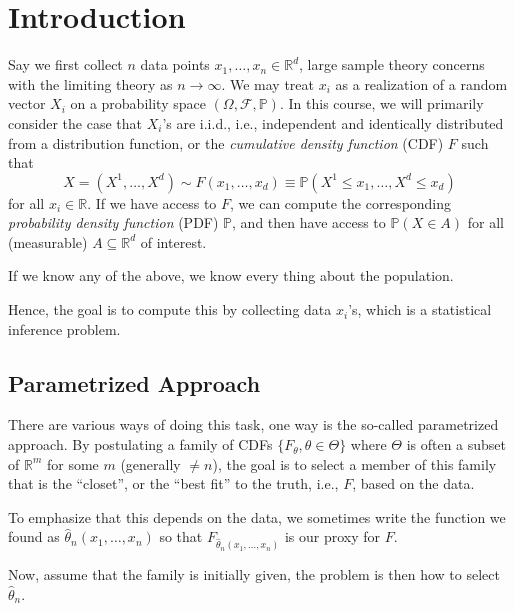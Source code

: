 \chapter{Introduction}
Say we first collect \(n\) data points \(x_1, \dots , x_n \in \mathbb{R} ^d\), large sample theory concerns with the limiting theory as \(n \to \infty \). We may treat \(x_i\) as a realization of a random vector \(X_i\) on a probability space \((\Omega , \mathscr{F} , \mathbb{P} )\). In this course, we will primarily consider the case that \(X_i\)'s are i.i.d., i.e., independent and identically distributed from a distribution function, or the \emph{cumulative density function} (CDF) \(F\) such that
\[
	X = (X^1, \dots , X^d) \sim F(x_1, \dots , x_d) \equiv \mathbb{P} (X^1 \leq x_1, \dots , X^d \leq x_d )
\]
for all \(x_i \in \mathbb{R} \). If we have access to \(F\), we can compute the corresponding \emph{probability density function} (PDF) \(\mathbb{P} \), and then have access to \(\mathbb{P} (X \in A)\) for all (measurable) \(A \subseteq \mathbb{R} ^d\) of interest.

\begin{remark}
	If we know any of the above, we know every thing about the population.
\end{remark}

Hence, the goal is to compute this by collecting data \(x_i\)'s, which is a statistical inference problem.

\section{Parametrized Approach}
There are various ways of doing this task, one way is the so-called parametrized approach. By postulating a family of CDFs \(\{ F_\theta , \theta \in \Theta \} \) where \(\Theta \) is often a subset of \(\mathbb{R} ^m\) for some \(m\) (generally \(\neq n\)), the goal is to select a member of this family that is the ``closet'', or the ``best fit'' to the truth, i.e., \(F\), based on the data.

\begin{note}
	To emphasize that this depends on the data, we sometimes write the function we found as \(\hat{\theta} _n(x_1, \dots  , x_n)\) so that \(F_{\hat{\theta} _n(x_1, \dots , x_n)} \) is our proxy for \(F\).
\end{note}

Now, assume that the family is initially given, the problem is then how to select \(\hat{\theta} _n\).

